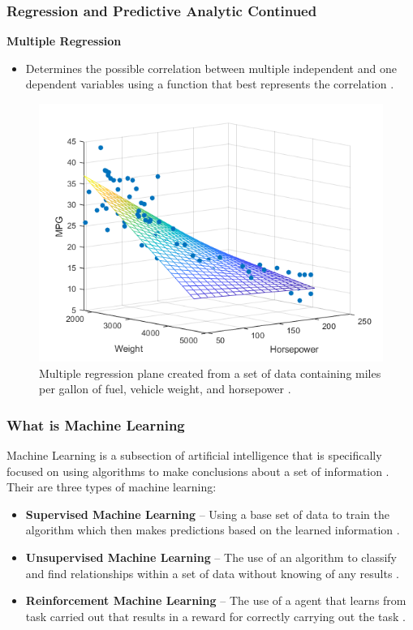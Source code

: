 \documentclass{beamer}
\begin{document}
\begin{frame}
\frametitle{Regression and Predictive Analytic Continued}
\scriptsize
\textbf{Multiple Regression}
\begin{itemize}
    \item Determines the possible correlation between multiple independent and one dependent variables using a function that best represents the correlation \cite{Stats2015}.
\end{itemize}

\begin{figure}[h]
\includegraphics[scale=0.3]{MultiReg}
\caption{ \scriptsize Multiple regression plane created from a set of data containing miles per gallon of fuel, vehicle weight, and horsepower \cite{MultiPNG}.}
\end{figure}


\end{frame}

\begin{frame}
\frametitle{What is Machine Learning}
\footnotesize
Machine Learning is a subsection of artificial intelligence that is specifically focused on using algorithms to make conclusions about a set of information \cite{pythonML}.
\newline
\newline
Their are three types of machine learning:
\begin{itemize}
 \item \textbf{Supervised Machine Learning} -- Using a base set of data to train the algorithm which then makes predictions based on the learned information \cite{pythonML}.
\item \textbf{Unsupervised Machine Learning} -- The use of an algorithm to classify and find relationships within a set of data without knowing of any results \cite{pythonML}.
\item \textbf{Reinforcement Machine Learning}
 -- The use of a agent that learns from task carried out that results in a reward for correctly carrying out the task \cite{pythonML}. \end{itemize}

\end{frame}
\end{document}
